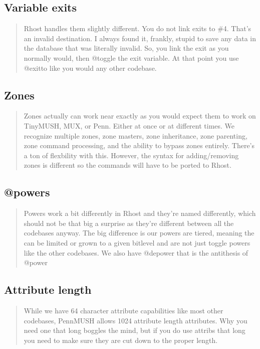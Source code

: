 \documentclass[letterpaper,10pt,english]{sphinxmanual}
\begin{document}
\subsection{Variable exits}
\label{\detokenize{differences:variable-exits}}\begin{quote}

\sphinxAtStartPar
Rhost handles them slightly different.  You do not link
exits to \#\sphinxhyphen{}4.  That’s an invalid destination.  I always found it, frankly,
stupid to save any data in the database that was literally invalid.  So,
you link the exit as you normally would, then @toggle the exit variable.
At that point you use @exitto like you would any other codebase.
\end{quote}


\subsection{Zones}
\label{\detokenize{differences:zones}}\begin{quote}

\sphinxAtStartPar
Zones actually can work near exactly as you would expect them to
work on TinyMUSH, MUX, or Penn.  Either at once or at different times.
We recognize multiple zones, zone masters, zone inheritance, zone
parenting, zone command processing, and the ability to bypass zones
entirely.  There’s a ton of flexbility with this.  However, the syntax
for adding/removing zones is different so the commands will have to be
ported to Rhost.
\end{quote}


\subsection{@powers}
\label{\detokenize{differences:powers}}\begin{quote}

\sphinxAtStartPar
Powers work a bit differently in Rhost and they’re named
differently, which should not be that big a surprise as they’re different
between all the codebases anyway.  The big difference is our powers are
tiered, meaning the can be limited or grown to a given bitlevel and are
not just toggle powers like the other codebases.  We also have @depower
that is the anti\sphinxhyphen{}thesis of @power
\end{quote}


\subsection{Attribute length}
\label{\detokenize{differences:attribute-length}}\begin{quote}

\sphinxAtStartPar
While we have 64 character attribute capabilities like
most other codebases, PennMUSH allows 1024 attribute length attributes.
Why you need one that long boggles the mind, but if you do use attribs
that long you need to make sure they are cut down to the proper length.
\end{quote}
\end{document}
